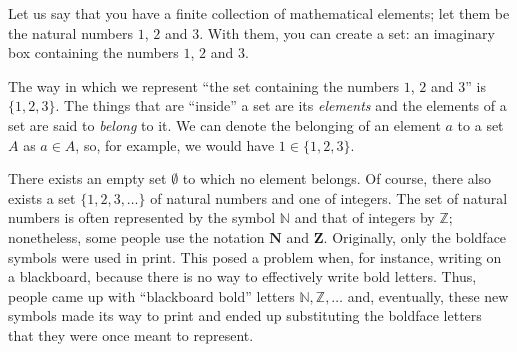 \begin{para}
Let us say that you have a finite collection of mathematical elements; let them be the natural numbers $1$, $2$ and $3$.
With them, you can create a set: an imaginary box containing the numbers $1$, $2$ and $3$.

The way in which we represent ``the set containing the numbers $1$, $2$ and $3$'' is $\{1, 2, 3\}$.
The things that are ``inside'' a set are its \emph{elements} and the elements of a set are said to \emph{belong} to it.
We can denote the belonging of an element $a$ to a set $A$ as $a\in A$, so, for example, we would have $1\in\{1,2,3\}$.

There exists an empty set $\emptyset$ to which no element belongs.
Of course, there also exists a set $\{1,2,3,\ldots\}$ of natural numbers and one of integers. 
The set of natural numbers is often represented by the symbol $\mathbb{N}$ and that of integers by $\mathbb{Z}$; nonetheless, some people use the notation $\mathbf{N}$ and $\mathbf{Z}$.
Originally, only the boldface symbols were used in print.
This posed a problem when, for instance, writing on a blackboard, because there is no way to effectively write bold letters.
Thus, people came up with ``blackboard bold'' letters $\mathbb{N},\mathbb{Z},\ldots$ and, eventually, these new symbols made its way to print and ended up substituting the boldface letters that they were once meant to represent.
\end{para}

